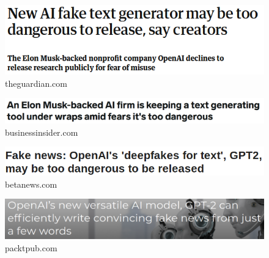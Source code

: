 \documentclass{beamer}
\begin{document}
\begin{frame}
    \begin{figure}
        \includegraphics[scale=0.8]{img/gpt2_en1.png}
    	\caption{theguardian.com}
    \end{figure}
    \begin{figure}
       	\includegraphics[scale=0.8]{img/gpt2_en2.png}
    	\caption{businessinsider.com}
    \end{figure}
    \begin{figure}
       	\includegraphics[scale=0.8]{img/gpt2_en3.png}
    	\caption{betanews.com}
    \end{figure}
    \begin{figure}
       	\includegraphics[scale=0.8]{img/gpt2_en4.png}
    	\caption{packtpub.com}
    \end{figure}
\end{frame}
\end{document}
